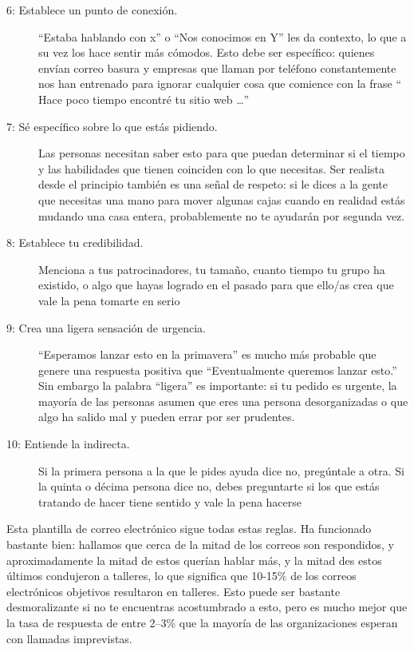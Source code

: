 \begin{description}
\item[6: Establece un punto de conexión.]
“Estaba hablando con x” o “Nos conocimos en Y” les da contexto,
lo que a su vez los hace sentir más cómodos.
Esto debe ser específico:
quienes envían correo basura y empresas que llaman por teléfono constantemente
nos han entrenado para ignorar cualquier cosa que comience con la frase
“ Hace poco tiempo encontré tu sitio web {\ldots}''
\item[7: Sé específico sobre lo que estás pidiendo.]

Las personas necesitan saber esto
para que puedan determinar si el tiempo y las habilidades que tienen
coinciden con lo que necesitas.
Ser realista desde el principio también es una señal de respeto:
 si le dices a la gente que necesitas una mano para  mover algunas cajas
 cuando en realidad estás mudando una casa entera,
 probablemente no te ayudarán por segunda vez.

\item[8: Establece tu credibilidad.]
Menciona a tus patrocinadores,
tu tamaño,
cuanto tiempo tu grupo ha existido, o algo que hayas logrado en el pasado
para que ello/as crea que vale la pena tomarte en serio


\item[9: Crea una ligera sensación de urgencia.]
“Esperamos lanzar esto en la primavera” es mucho más probable que genere una respuesta positiva que “Eventualmente queremos lanzar esto.”
Sin embargo la palabra “ligera” es importante:
si tu pedido es urgente, 
la mayoría de las personas asumen que eres una persona desorganizadas o que algo ha salido mal
y pueden errar por ser prudentes.


\item[10: Entiende la indirecta.]
Si la primera persona a la que le pides ayuda dice no,
pregúntale a otra.
Si la quinta o décima persona dice no,
debes preguntarte si los que estás tratando de hacer tiene sentido y vale la pena hacerse

\end{description}

Esta plantilla de correo electrónico sigue todas estas reglas.
Ha funcionado bastante bien:
hallamos que cerca de la mitad de los correos son respondidos,
y aproximadamente la mitad de estos querían hablar más,
y la mitad des estos últimos condujeron a talleres,
lo que significa que 10-15\% de los correos electrónicos objetivos resultaron en talleres.
Esto puede ser bastante desmoralizante si no te encuentras acostumbrado a esto, 
pero es mucho mejor que la tasa de respuesta de entre  2--3\% que la mayoría de las organizaciones esperan con llamadas imprevistas.

